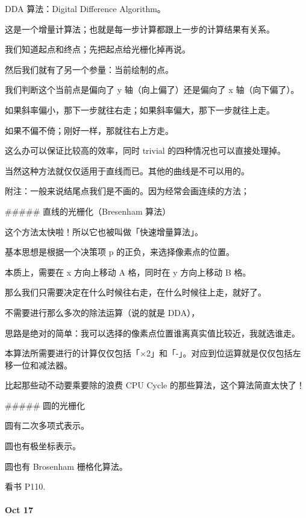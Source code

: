 \documentclass[
]{article}
\newenvironment{Shaded}{}{}
\newcommand{\FunctionTok}[1]{\textcolor[rgb]{0.02,0.16,0.49}{#1}}
\newcommand{\NormalTok}[1]{#1}
\begin{document}
\begin{Shaded}
\begin{Highlighting}[]
\NormalTok{DDA 算法：Digital Difference Algorithm。}

\NormalTok{这是一个增量计算法；也就是每一步计算都跟上一步的计算结果有关系。}

\NormalTok{我们知道起点和终点；先把起点给光栅化掉再说。}

\NormalTok{然后我们就有了另一个参量：当前绘制的点。}

\NormalTok{我们判断这个当前点是偏向了 y 轴（向上偏了）还是偏向了 x 轴（向下偏了）。}

\NormalTok{如果斜率偏小，那下一步就往右走；如果斜率偏大，那下一步就往上走。}

\NormalTok{如果不偏不倚；刚好一样，那就往右上方走。}

\NormalTok{这么办可以保证比较高的效率，同时 trivial 的四种情况也可以直接处理掉。}

\NormalTok{当然这种方法就仅仅适用于直线而已。其他的曲线是不可以用的。}

\NormalTok{附注：一般来说结尾点我们是不画的。因为经常会画连续的方法；}

\FunctionTok{##### 直线的光栅化（Bresenham 算法）}

\NormalTok{这个方法太快啦！所以它也被叫做「快速增量算法」。}

\NormalTok{基本思想是根据一个决策项 p 的正负，来选择像素点的位置。}

\NormalTok{本质上，需要在 x 方向上移动 A 格，同时在 y 方向上移动 B 格。}

\NormalTok{那么我们只需要决定在什么时候往右走，在什么时候往上走，就好了。}

\NormalTok{不需要进行那么多次的除法运算（说的就是 DDA），}

\NormalTok{思路是绝对的简单：我可以选择的像素点位置谁离真实值比较近，我就选谁走。}

\NormalTok{本算法所需要进行的计算仅仅包括「×2」和「-」。对应到位运算就是仅仅包括左移一位和减法器。}

\NormalTok{比起那些动不动要乘要除的浪费 CPU Cycle 的那些算法，这个算法简直太快了！}

\FunctionTok{##### 圆的光栅化}

\NormalTok{圆有二次多项式表示。}

\NormalTok{圆也有极坐标表示。}

\NormalTok{圆也有 Brosenham 栅格化算法。}

\NormalTok{看书 P110.}
\end{Highlighting}
\end{Shaded}

\hypertarget{header-n184}{%
\paragraph{Oct 17}\label{header-n184}}
\end{document}
